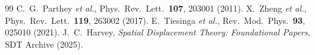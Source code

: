 
\begin{thebibliography}{99}
 C.~G.~Parthey \emph{et al.}, Phys.\ Rev.\ Lett.\ \textbf{107}, 203001 (2011).
 X.~Zheng \emph{et al.}, Phys.\ Rev.\ Lett.\ \textbf{119}, 263002 (2017).
 E.~Tiesinga \emph{et al.}, Rev.\ Mod.\ Phys.\ \textbf{93}, 025010 (2021).
 J.~C.~Harvey, \emph{Spatial Displacement Theory: Foundational Papers}, SDT Archive (2025).
\end{thebibliography}



